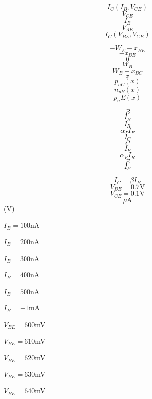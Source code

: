 \documentclass[letterpaper 12pt]{book}
\begin{document}
\[ I_C(I_B,V_{CE}) \]
\[ V_{CE} \]
\[ I_B \]
\[ V_{BE} \]
\[ I_C(V_{BE},V_{CE}) \]


\[ -W_E  - x_{BE} \]
\[ -x_{BE} \]
\[ 0 \]
\[ W_B \]
\[ W_B + x_{BC} \]
\[ x \]
\[ p_{nC}(x) \]
\[ n_{pB}(x) \]
\[ p_nE(x) \]

\[ B \]
\[ I_B \]
\[ I_R \]
\[ \alpha_F I_F \]
\[ I_C \]
\[ C \]
\[ I_F \]
\[ \alpha_R I_R \]
\[ E \]
\[ I_E \]

\[ I_C = \beta I_B \]
\[ V_{BE} = 0.7\mathrm{V} \]
\[ V_{CE} = 0.1\mathrm{V} \]
\[ \mu \mathrm{A} \]
(V) 

$I_B = 100$nA

$I_B = 200$nA

$I_B = 300$nA

$I_B = 400$nA

$I_B = 500$nA

$I_B = -1$mA
 
 $V_{BE} = 600$mV

 $V_{BE} = 610$mV

 $V_{BE} = 620$mV

 $V_{BE} = 630$mV

 $V_{BE} = 640$mV
 
\end{document}
